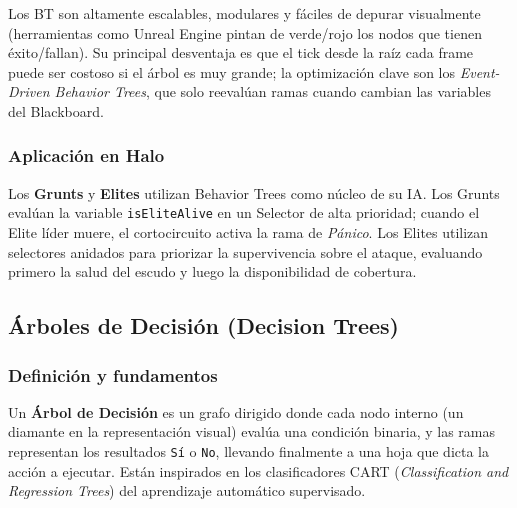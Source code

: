 \documentclass[12pt,letterpaper]{article}
\begin{document}
Los BT son altamente escalables, modulares y fáciles de depurar visualmente (herramientas como Unreal Engine pintan de verde/rojo los nodos que tienen éxito/fallan). Su principal desventaja es que el tick desde la raíz cada frame puede ser costoso si el árbol es muy grande; la optimización clave son los \textit{Event-Driven Behavior Trees}, que solo reevalúan ramas cuando cambian las variables del Blackboard.

\subsubsection{Aplicación en Halo}

Los \textbf{Grunts} y \textbf{Elites} utilizan Behavior Trees como núcleo de su IA. Los Grunts evalúan la variable \texttt{isEliteAlive} en un Selector de alta prioridad; cuando el Elite líder muere, el cortocircuito activa la rama de \textit{Pánico}. Los Elites utilizan selectores anidados para priorizar la supervivencia sobre el ataque, evaluando primero la salud del escudo y luego la disponibilidad de cobertura.

\subsection{Árboles de Decisión (Decision Trees)}

\subsubsection{Definición y fundamentos}

Un \textbf{Árbol de Decisión} es un grafo dirigido donde cada nodo interno (un diamante en la representación visual) evalúa una condición binaria, y las ramas representan los resultados \texttt{Sí} o \texttt{No}, llevando finalmente a una hoja que dicta la acción a ejecutar. Están inspirados en los clasificadores CART (\textit{Classification and Regression Trees}) del aprendizaje automático supervisado.
\end{document}
